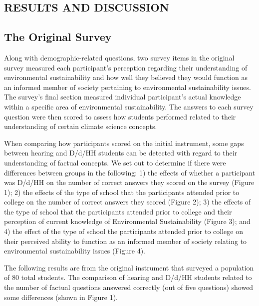 \documentclass[11.5pt]{sig-alternate} %
\begin{document}
\begin{large}
\section*{RESULTS AND DISCUSSION}
\subsection*{The Original Survey}

Along with demographic-related questions, two survey items in the original survey measured each participant’s perception regarding their understanding of environmental sustainability and how well they believed they would function as an informed member of society pertaining to environmental sustainability issues. The survey’s final section measured individual participant’s actual knowledge within a specific area of environmental sustainability. The answers to each survey question were then scored to assess how students performed related to their understanding of certain climate science concepts.

When comparing how participants scored on the initial instrument, some gaps between hearing and D/d/HH students can be detected with regard to their understanding of factual concepts. We set out to determine if there were differences between groups in the following: 1) the effects of whether a participant was D/d/HH on the number of correct answers they scored on the survey (Figure 1); 2) the effects of the type of school that the participants attended prior to college on the number of correct answers they scored (Figure 2); 3) the effects of the type of school that the participants attended prior to college and their perception of current knowledge of Environmental Sustainability (Figure 3); and 4) the effect of the type of school the participants attended prior to college on their perceived ability to function as an informed member of society relating to environmental sustainability issues (Figure 4).

The following results are from the original instrument that surveyed a population of 80 total students.  The comparison of hearing and D/d/HH students related to the number of factual questions answered correctly (out of five questions) showed some differences (shown in Figure 1).


\end{large}
\end{document}
